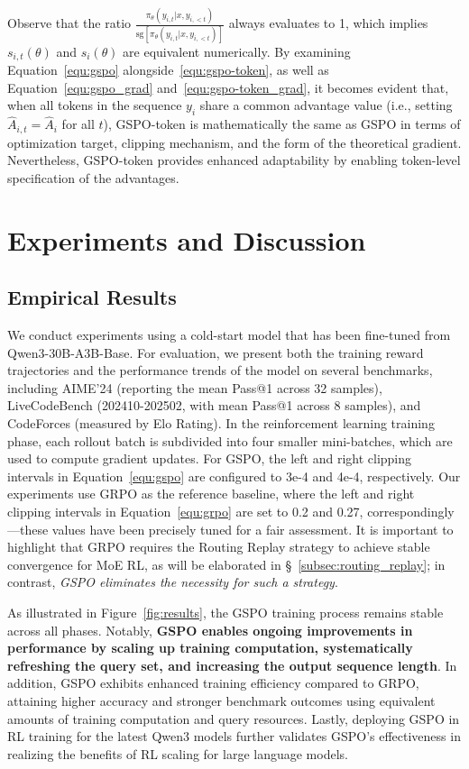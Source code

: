 Observe that the ratio $\frac{ \pi_{\theta} (y_{i,t} | x, y_{i,<t}) }{ \mathrm{sg} \left[ \pi_{\theta} (y_{i,t} | x, y_{i,<t}) \right] }$ always evaluates to 1, which implies $s_{i,t}(\theta)$ and $s_{i}(\theta)$ are equivalent numerically. By examining Equation~\eqref{equ:gspo} alongside~\eqref{equ:gspo-token}, as well as Equation~\eqref{equ:gspo_grad} and~\eqref{equ:gspo-token_grad}, it becomes evident that, when all tokens in the sequence $y_i$ share a common advantage value (i.e., setting $\widehat{A}_{i,t} = \widehat{A}_{i}$ for all $t$), GSPO-token is mathematically the same as GSPO in terms of optimization target, clipping mechanism, and the form of the theoretical gradient. Nevertheless, GSPO-token provides enhanced adaptability by enabling token-level specification of the advantages.

\section{Experiments and Discussion}

\subsection{Empirical Results}

We conduct experiments using a cold-start model that has been fine-tuned from Qwen3-30B-A3B-Base. For evaluation, we present both the training reward trajectories and the performance trends of the model on several benchmarks, including AIME'24 (reporting the mean Pass@1 across 32 samples), LiveCodeBench (202410-202502, with mean Pass@1 across 8 samples), and CodeForces (measured by Elo Rating). In the reinforcement learning training phase, each rollout batch is subdivided into four smaller mini-batches, which are used to compute gradient updates. For GSPO, the left and right clipping intervals in Equation~\eqref{equ:gspo} are configured to 3e-4 and 4e-4, respectively. Our experiments use GRPO as the reference baseline, where the left and right clipping intervals in Equation~\eqref{equ:grpo} are set to 0.2 and 0.27, correspondingly—these values have been precisely tuned for a fair assessment. It is important to highlight that GRPO requires the Routing Replay strategy to achieve stable convergence for MoE RL, as will be elaborated in \S~\ref{subsec:routing_replay}; in contrast, \textit{GSPO eliminates the necessity for such a strategy}.

As illustrated in Figure~\ref{fig:results}, the GSPO training process remains stable across all phases. Notably, \textbf{GSPO enables ongoing improvements in performance by scaling up training computation, systematically refreshing the query set, and increasing the output sequence length}. In addition, GSPO exhibits enhanced training efficiency compared to GRPO, attaining higher accuracy and stronger benchmark outcomes using equivalent amounts of training computation and query resources. Lastly, deploying GSPO in RL training for the latest Qwen3 models further validates GSPO’s effectiveness in realizing the benefits of RL scaling for large language models.

